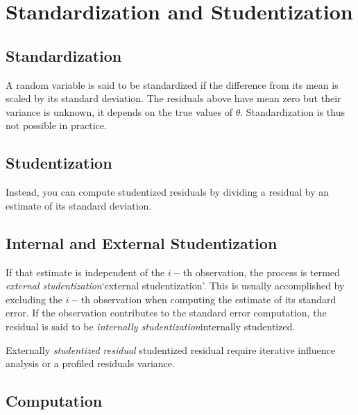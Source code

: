 \documentclass[12pt, a4paper]{article}
\theoremstyle{plain}
\theoremstyle{definition}
\theoremstyle{remark}
\begin{document}
\newpage
\section{Standardization and Studentization}
\subsection{Standardization} %

A random variable is said to be standardized if the difference from its mean is scaled by its standard deviation. The residuals above have mean zero but their variance is unknown, it depends on the true values of $\theta$. Standardization is thus not possible in practice.

\subsection{Studentization} %
Instead, you can compute studentized residuals by dividing a residual by an estimate of its standard deviation. 

\subsection{Internal and External Studentization} %
If that estimate is independent of the $i-$th observation, the process is termed \emph{external studentization}`external studentization'. This is usually accomplished by excluding the $i-$th observation when computing the estimate of its standard error. If the observation contributes to the
standard error computation, the residual is said to be \emph{internally studentization}internally studentized.

Externally \emph{studentized residual} studentized residual require iterative influence analysis or a profiled residuals variance.

\subsection{Computation}%

\end{document}
